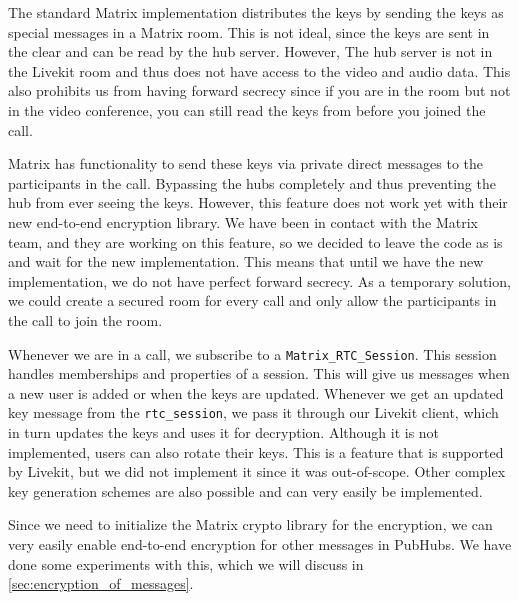 \documentclass{report}
\begin{document}
The standard Matrix implementation distributes the keys by sending the keys as special messages in a Matrix room.
This is not ideal, since the keys are sent in the clear and can be read by the hub server. However, The hub
server is not in the Livekit room and thus does not have access to the video and audio data. This also prohibits us from
having forward secrecy since if you are in the room but not in the video conference, you can still read the keys from
before you joined the call.

Matrix has functionality to send these keys via private direct messages to the participants in the call. Bypassing
the hubs completely and thus preventing the hub from ever seeing the keys. However, this feature does not work yet 
with their new end-to-end encryption library. We have been in contact with the Matrix team, and they are working 
on this feature, so we decided to leave the code as is and wait for the new implementation. This means that until
we have the new implementation, we do not have perfect forward secrecy. As a temporary solution, we could create
a secured room for every call and only allow the participants in the call to join the room.

Whenever we are in a call, we subscribe to a \lstinline[language=js]{Matrix_RTC_Session}. This session handles
memberships and properties of a session. This will give us messages when a new user is added or when the keys are
updated. Whenever we get an updated key message from the \lstinline[language=js]{rtc_session}, we pass it through
our Livekit client, which in turn updates the keys and uses it for decryption. Although it is not implemented, users
can also rotate their keys. This is a feature that is supported by Livekit, but we did not implement it since it was
out-of-scope. Other complex key generation schemes are also possible and can very easily be implemented.

Since we need to initialize the Matrix crypto library for the encryption, we can very easily enable end-to-end
encryption for other messages in PubHubs. We have done some experiments with this, which we will discuss in \autoref{sec:encryption_of_messages}.
\end{document}
